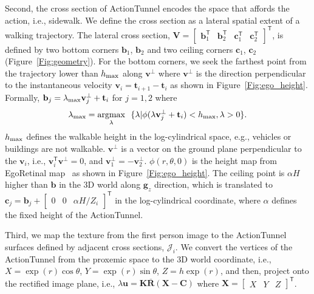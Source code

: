 \documentclass[10pt,twocolumn,letterpaper]{article}
\begin{document}
Second, the cross section of ActionTunnel encodes the space that affords the action, i.e., sidewalk. We define the cross section as a lateral spatial extent of a walking trajectory. The lateral cross section, $\mathbf{V}=\left[\begin{array}{cccc} \mathbf{b}_1^{\mathsf{T}} & \mathbf{b}_2^{\mathsf{T}} & \mathbf{c}_1^{\mathsf{T}} & \mathbf{c}_2^{\mathsf{T}}\end{array}\right]^{\mathsf{T}}$, is defined by two bottom corners $\mathbf{b}_{1}$, $\mathbf{b}_{2}$ and two ceiling corners $\mathbf{c}_{1}$, $\mathbf{c}_{2}$ (Figure~\ref{Fig:geometry}). For the bottom corners, we seek the farthest point from the trajectory lower than $h_{\rm max}$ along $\mathbf{v}^\bot$ where $\mathbf{v}^\bot$ is the direction perpendicular to the instantaneous velocity $\mathbf{v}_i = \mathbf{t}_{i+1} - \mathbf{t}_i$ as shown in Figure~\ref{Fig:ego_height}. Formally, $\mathbf{b}_j = \lambda_{\rm max}\mathbf{v}_j^\bot + \mathbf{t}_i$ for $j=1,2$ where
\begin{align*}
    \lambda_{\rm max} = \underset{ \lambda}{\operatorname{argmax}}~~ \{\lambda | \phi(\lambda\mathbf{v}_j^\bot + \mathbf{t}_i)<h_{\rm max}, \lambda>0\}.
\end{align*}
$h_{\rm max}$ defines the walkable height in the log-cylindrical space, e.g., vehicles or buildings are not walkable. $\mathbf{v}^{\bot}$ is a vector on the ground plane perpendicular to the $\mathbf{v}_i$, i.e., $\mathbf{v}_i^{\mathsf{T}}\mathbf{v}^{\bot}=0$, and $\mathbf{v}_1^{\bot}=-\mathbf{v}_2^{\bot}$. $\phi(r,\theta,0)$ is the height map from EgoRetinal map~\cite{park:2016_future} as shown in Figure~\ref{Fig:ego_height}. The ceiling point is $\alpha H$ higher than $\mathbf{b}$ in the 3D world along $\mathbf{g}_z$ direction, which is translated to $\mathbf{c}_j=\mathbf{b}_j+\left[\begin{array}{ccc} 0 & 0 & \alpha H/Z_i\end{array}\right]^{\mathsf{T}}$ in the log-cylindrical coordinate, where $\alpha$ defines the fixed height of the ActionTunnel. 

Third, we map the texture from the first person image to the ActionTunnel surfaces defined by adjacent cross sections, $\mathcal{J}_i$. We convert the vertices of the ActionTunnel from the proxemic space to the 3D world coordinate, i.e., $X=\exp{(r)}\cos\theta$, $Y=\exp{(r)}\sin\theta$, $Z=h\exp{(r)}$, and then, project onto the rectified image plane, i.e., $\lambda\mathbf{u}=\mathbf{K}\overline{\mathbf{R}}(\mathbf{X} -\mathbf{C})$ where $\mathbf{X}=\left[\begin{array}{ccc} X & Y & Z\end{array}\right]^{\mathsf{T}}$. 
\end{document}

